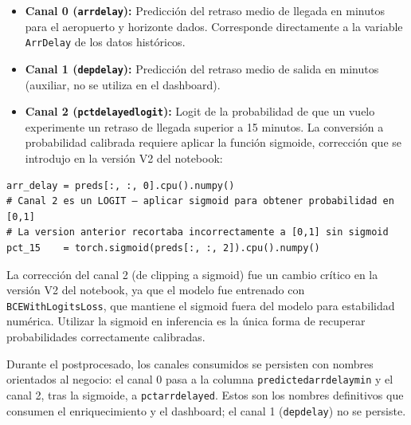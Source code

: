 \documentclass[12pt,oneside,a4paper]{report}
\renewcommand{\_}{\textunderscore\allowbreak}
\begin{document}
\begin{itemize}
    \item \textbf{Canal 0 (\texttt{arr\_delay}):} Predicción del retraso medio de llegada en minutos para el aeropuerto y horizonte dados. Corresponde directamente a la variable \texttt{ArrDelay} de los datos históricos.
    \item \textbf{Canal 1 (\texttt{dep\_delay}):} Predicción del retraso medio de salida en minutos (auxiliar, no se utiliza en el dashboard).
    \item \textbf{Canal 2 (\texttt{pct\_delayed\_logit}):} Logit de la probabilidad de que un vuelo experimente un retraso de llegada superior a 15 minutos. La conversión a probabilidad calibrada requiere aplicar la función sigmoide, corrección que se introdujo en la versión V2 del notebook:
\end{itemize}
\newpage
\begin{lstlisting}[style=pystyle, caption={Extracción y postprocesado correcto de las salidas del modelo.}]
arr_delay = preds[:, :, 0].cpu().numpy()
# Canal 2 es un LOGIT — aplicar sigmoid para obtener probabilidad en [0,1]
# La version anterior recortaba incorrectamente a [0,1] sin sigmoid
pct_15    = torch.sigmoid(preds[:, :, 2]).cpu().numpy()
\end{lstlisting}

La corrección del canal 2 (de clipping a sigmoid) fue un cambio crítico en la versión V2 del notebook, ya que el modelo fue entrenado con \texttt{BCEWithLogitsLoss}, que mantiene el sigmoid fuera del modelo para estabilidad numérica. Utilizar la sigmoid en inferencia es la única forma de recuperar probabilidades correctamente calibradas.

Durante el postprocesado, los canales consumidos se persisten con nombres orientados al negocio:
el canal 0 pasa a la columna \texttt{predicted\_arr\_delay\_min} y el canal 2, tras la sigmoide,
a \texttt{pct\_arr\_delayed\_15}. Estos son los nombres definitivos que consumen el enriquecimiento
y el dashboard; el canal 1 (\texttt{dep\_delay}) no se persiste.
\end{document}
